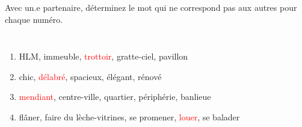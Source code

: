 \begin{frame}{}
  Avec un.e partenaire, déterminez le mot qui ne correspond pas aux autres pour chaque numéro.
  \begin{columns}
      \begin{enumerate}
        \item HLM, immeuble, \textcolor<2->{red}{trottoir}, gratte-ciel, pavillon
        \item chic, \textcolor<4->{red}{délabré}, spacieux, élégant, rénové
        \item \textcolor<6->{red}{mendiant}, centre-ville, quartier, périphérie, banlieue
        \item flâner, faire du lèche-vitrines, se promener, \textcolor<8->{red}{louer}, se balader
      \end{enumerate}
      \begin{minipage}[c][0.75\textheight]{\linewidth}
        \begin{center}
        \end{center}
      \end{minipage}
  \end{columns}
\end{frame}